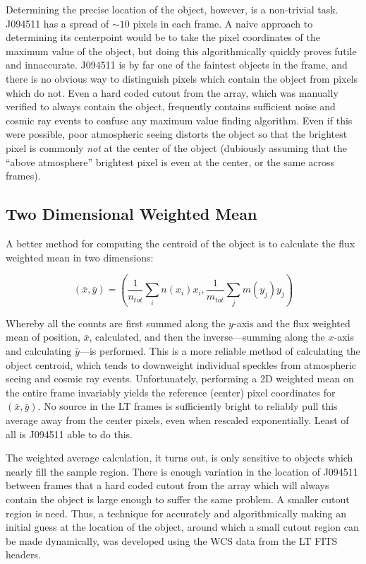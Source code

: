 \documentclass[a4paper,11pt]{article}
\begin{document}
Determining the precise location of the object, however, is a non-trivial task. J094511 has a spread of $\sim10$ pixels in each frame. A naive approach to determining its centerpoint would be to take the pixel coordinates of the maximum value of the object, but doing this algorithmically quickly proves futile and innaccurate. J094511 is by far one of the faintest objects in the frame, and there is no obvious way to distinguish pixels which contain the object from pixels which do not. Even a hard coded cutout from the array, which was manually verified to always contain the object, frequently contains sufficient noise and cosmic ray events to confuse any maximum value finding algorithm. Even if this were possible, poor atmospheric seeing distorts the object so that the brightest pixel is commonly \textit{not} at the center of the object (dubiously assuming that the ``above atmosphere'' brightest pixel is even at the center, or the same across frames).

\subsection{Two Dimensional Weighted Mean}\label{sec:flux_weighted_mean}

A better method for computing the centroid of the object is to calculate the flux weighted mean in two dimensions:

\begin{equation}
        (\bar{x},\bar{y}) =
        \left( \frac{1}{n_{tot}} \sum_{i}^{} n(x_i) x_i,
        \frac{1}{m_{tot}} \sum_{j}^{} m(y_j) y_j \right)
\end{equation}

\noindent Whereby all the counts are first summed along the $y$-axis and the flux weighted mean of position, $\bar{x}$, calculated, and then the inverse---summing along the $x$-axis and calculating $\bar{y}$---is performed. This is a more reliable method of calculating the object centroid, which tends to downweight individual speckles from atmospheric seeing and cosmic ray events. Unfortunately, performing a 2D weighted mean on the entire frame invariably yields the reference (center) pixel coordinates for $(\bar{x},\bar{y})$. No source in the LT frames is sufficiently bright to reliably pull this average away from the center pixels, even when rescaled exponentially. Least of all is J094511 able to do this.

The weighted average calculation, it turns out, is only sensitive to objects which nearly fill the sample region. There is enough variation in the location of J094511 between frames that a hard coded cutout from the array which will always contain the object is large enough to suffer the same problem. A smaller cutout region is need. Thus, a technique for accurately and algorithmically making an initial guess at the location of the object, around which a small cutout region can be made dynamically, was developed using the WCS data from the LT FITS headers.
\end{document}
